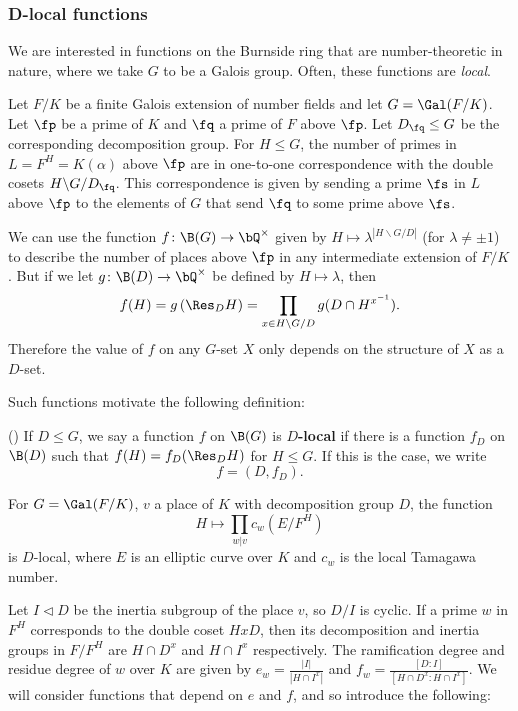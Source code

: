 \subsubsection{D-local functions}\label{D-loc}

We are interested in functions on the Burnside ring that are number-theoretic in nature, where we take $G$ to be a Galois group. Often, these functions are \textit{local}. 

\begin{example}
Let $F / K$ be a finite Galois extension of number fields and let $G = \Gal(F / K)$. Let $\fp$ be a prime of $K$ and $\fq$ a prime of $F$ above $\fp$. Let $D_{\fq} \leq G$ be the corresponding decomposition group. For $H \leq G$, the number of primes in $L = F^{H} = K(\alpha)$ above $\fp$ are in one-to-one correspondence with the double cosets $H \backslash G / D_{\fq}$. This correspondence is given by sending a prime $\fs$ in $L$ above $\fp$ to the elements of $G$ that send $\fq$ to some prime above $\fs$.

We can use the function $f \colon \B(G) \to \bQ^{\times}$ given by $H \mapsto  \lambda^{| H \backslash G / D|}$ (for $\lambda \not= \pm 1$) to describe the number of places above $\fp$ in any intermediate extension of $F / K$. But if we let $g \colon \B(D) \to \bQ^{\times}$ be defined by $H \mapsto \lambda$, then 
        \[ f(H) = g\left(\Res_D H\right) = \prod_{x \in H \backslash G / D} g(D \cap H^{x^{-1}}) .\]
Therefore the value of $f$ on any $G$-set $X$ only depends on the structure of $X$ as a $D$-set.
\end{example}

Such functions motivate the following definition:

\begin{defn}(\cite[Definition 2.33]{reg-const})\label{D-loc-fn}
    If $D \leq G$, we say a function $f$ on $\B(G)$ is \textbf{$D$-local} if there is a function $f_D$ on $\B(D)$ such that $f(H) = f_D(\Res_D H)$ for $H \leq G$.
    If this is the case, we write
    \[ f = (D, f_D). \]
\end{defn}

\begin{example}\label{tama-ex}
    For $G = \Gal(F / K)$, $v$ a place of $K$ with decomposition group $D$, the function
    \[ H \mapsto \prod_{w | v} c_w(E / F^{H}) \]
    is $D$-local, where $E$ is an elliptic curve over $K$ and $c_w$ is the local Tamagawa number. 
\end{example}

Let $I \triangleleft D$ be the inertia subgroup of the place $v$, so $D / I$ is cyclic. If a prime $w$ in $F^H$ corresponds to the double coset $HxD$, then its decomposition and inertia groups in $F / F^H$ are $H \cap D^x$ and $H \cap I^x$ respectively.
The ramification degree and residue degree of $w$ over $K$ are given by $e_w = \frac{|I|}{|H \cap I^x|}$ and $f_w = \frac{[D : I]}{[H \cap D^x : H \cap I^x]}$. We will consider functions that depend on $e$ and $f$, and so introduce the following:

